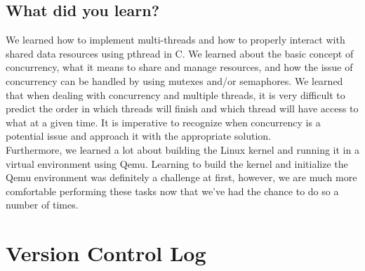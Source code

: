 \documentclass[onecolumn, draftclsnofoot,10pt, compsoc]{IEEEtran}
\begin{document}
\subsection{What did you learn?}
\noindent 
We learned how to implement multi-threads and how to properly interact with shared data resources using pthread in C. We learned about the basic concept of concurrency, what it means to share and manage resources, and how the issue of concurrency can be handled by using mutexes and/or semaphores. We learned that when dealing with concurrency and multiple threads, it is very difficult to predict the order in which threads will finish and which thread will have access to what at a given time. It is imperative to recognize when concurrency is a potential issue and approach it with the appropriate solution.\\

Furthermore, we learned a lot about building the Linux kernel and running it in a virtual environment using Qemu. Learning to build the kernel and initialize the Qemu environment was definitely a challenge at first, however, we are much more comfortable performing these tasks now that we've had the chance to do so a number of times.
\\
\section{Version Control Log}
\end{document}
